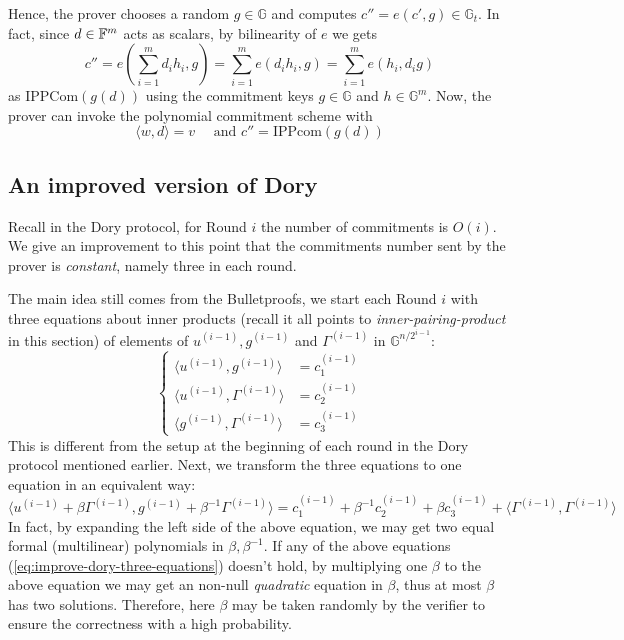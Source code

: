 \documentclass{article}
\begin{document}
\begin{enumerate}
Hence, the prover chooses a random $g \in \mathbb{G}$ and computes $c'' = e(c', g) \in \mathbb{G}_t$. In fact, since $d \in \mathbb{F}^m$ acts as scalars, by bilinearity of $e$ we gets
\begin{equation*}
c'' = e(\sum_{i = 1}^m d_i h_i, g) = \sum_{i = 1}^m e(d_i h_i, g) = \sum_{i = 1}^m e(h_i, d_ig)
\end{equation*}
as $\text{IPPCom}(g(d))$ using the commitment keys $g \in \mathbb{G}$ and $h \in \mathbb{G}^m$. Now, the prover can invoke the polynomial commitment scheme with
\begin{equation*}
\langle w, d \rangle = v \quad \text{ and } c'' = \text{IPPcom}(g(d))
\end{equation*}
\end{enumerate}

\subsection{An improved version of Dory}

Recall in the Dory protocol, for Round $i$ the number of commitments is $O(i)$. We give an improvement to this point that the commitments number sent by the prover is \textit{constant}, namely three in each round. 

The main idea still comes from the Bulletproofs, we start each Round $i$ with three equations about inner products (recall it all points to \textit{inner-pairing-product} in this section) of elements of $u^{(i-1)}, g^{(i-1)}$ and $\Gamma^{(i-1)}$ in $\mathbb{G}^{n/2^{i-1}}$:
\begin{equation} \label{eq:improve-dory-three-equations}
\begin{cases}
\langle u^{(i-1)}, g^{(i-1)} \rangle & = c_1^{(i-1)} \\
\langle u^{(i-1)}, \Gamma^{(i-1)} \rangle & = c_2^{(i-1)} \\
\langle g^{(i-1)}, \Gamma^{(i-1)} \rangle & = c_3^{(i-1)}
\end{cases}
\end{equation}
This is different from the setup at the beginning of each round in the Dory protocol mentioned earlier. Next, we transform the three equations to one equation in an equivalent way:
\begin{equation} \label{eq:improve-dory-second-equation}
\langle u^{(i-1)} + \beta \Gamma^{(i-1)}, g^{(i-1)} + \beta^{-1} \Gamma^{(i-1)} \rangle = c_1^{(i-1)} + \beta^{-1} c_2^{(i-1)} + \beta c_3^{(i-1)} + \langle \Gamma^{(i-1)}, \Gamma^{(i-1)}\rangle
\end{equation}
In fact, by expanding the left side of the above equation, we may get two equal formal (multilinear) polynomials in $\beta, \beta^{-1}$. If any of the above equations (\ref{eq:improve-dory-three-equations}) doesn't hold, by multiplying one $\beta$ to the above equation we may get an non-null \textit{quadratic} equation in $\beta$, thus at most $\beta$ has two solutions. Therefore, here $\beta$ may be taken randomly by the verifier to ensure the correctness with a high probability. 
\end{document}
